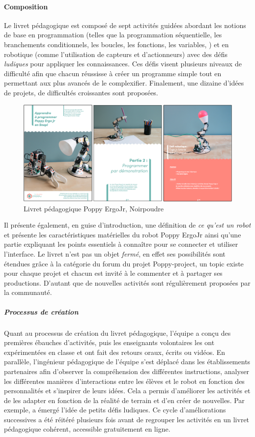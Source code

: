         \paragraph{Composition} 
            Le livret pédagogique est composé de sept activités guidées abordant les notions de base en programmation (telles que la programmation séquentielle, les branchements conditionnels, les boucles, les fonctions, les variables, \etc) et en robotique (comme l'utilisation de capteurs et d'actionneurs) avec des défis \textit{ludiques} pour appliquer les connaissances. Ces défis visent plusieurs niveaux de difficulté afin que chacun réussisse à créer un programme simple tout en permettant aux plus avancés de le complexifier. Finalement, une dizaine d'idées de projets, de difficultés croissantes sont proposées.
            \begin{figure}[!h]
                \centering
                \includegraphics[width=0.9\linewidth]{Figures/Poppy-Livret_pedagogique}
                \caption{Livret pédagogique Poppy ErgoJr, Noirpoudre~}
                \label{fig:Livret_pedagogique}
            \end{figure}\par%
            Il présente également, en guise d'introduction, une définition de \textit{ce qu'est un robot} et présente les caractéristiques matérielles du robot Poppy ErgoJr ainsi qu'une partie  expliquant les points essentiels à connaître pour se connecter et utiliser l'interface. 
            Le livret n'est pas un objet \textit{fermé}, en effet ses possibilités sont étendues grâce à la catégorie  du forum du projet Poppy-project, un topic existe pour chaque projet et chacun est invité à le commenter et à partager ses productions. D’autant que de nouvelles activités sont régulièrement proposées par la communauté.
        \subparagraph{Processus de création}
            Quant au processus de création du livret pédagogique, l'équipe a conçu des premières ébauches d'activités, puis les enseignants volontaires les ont expérimentées en classe et ont fait des retours oraux, écrits ou vidéos. En parallèle, l'ingénieur pédagogique de l’équipe s'est déplacé dans les établissements partenaires afin d'observer la compréhension des différentes instructions, analyser les différentes manières d'interactions entre les élèves et le robot en fonction des personnalités et s'inspirer de leurs idées. Cela a permis d'améliorer les activités et de les adapter en fonction de la réalité de terrain et d'en créer de nouvelles. Par exemple, a émergé l’idée de petits défis ludiques.
            Ce cycle d'améliorations successives a été réitéré plusieurs fois avant de regrouper les activités en un livret pédagogique cohérent, accessible gratuitement en ligne.